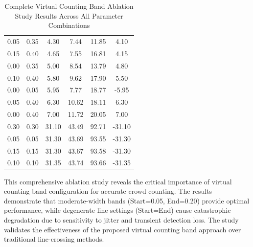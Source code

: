 \begin{table}[h]
{\begin{tabular}{|c|c|c|c|c|c|}
0.05 & 0.35 & 4.30 & 7.44 & 11.85 & 4.10 \\
0.15 & 0.40 & 4.65 & 7.55 & 16.81 & 4.15 \\
0.00 & 0.35 & 5.00 & 8.54 & 13.79 & 4.80 \\
0.10 & 0.40 & 5.80 & 9.62 & 17.90 & 5.50 \\
0.00 & 0.05 & 5.95 & 7.77 & 18.77 & -5.95 \\
0.05 & 0.40 & 6.30 & 10.62 & 18.11 & 6.30 \\
0.00 & 0.40 & 7.00 & 11.72 & 20.05 & 7.00 \\
0.30 & 0.30 & 31.10 & 43.49 & 92.71 & -31.10 \\
0.05 & 0.05 & 31.30 & 43.69 & 93.55 & -31.30 \\
0.15 & 0.15 & 31.30 & 43.67 & 93.58 & -31.30 \\
0.10 & 0.10 & 31.35 & 43.74 & 93.66 & -31.35 \\
\hline
\end{tabular}%
}
\caption{Complete Virtual Counting Band Ablation Study Results Across All Parameter Combinations}
\label{tab:Counting_Band_Complete_Ablation}
\end{table}

This comprehensive ablation study reveals the critical importance of virtual counting band configuration for accurate crowd counting. The results demonstrate that moderate-width bands (Start=0.05, End=0.20) provide optimal performance, while degenerate line settings (Start=End) cause catastrophic degradation due to sensitivity to jitter and transient detection loss. The study validates the effectiveness of the proposed virtual counting band approach over traditional line-crossing methods.
